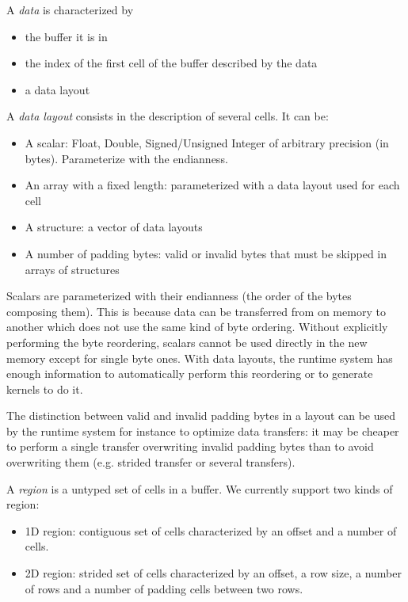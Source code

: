 \documentclass[twocolumn]{article}
\begin{document}
\begin{defin}
A \emph{data} is characterized by
\begin{itemize}
   \item the buffer it is in
   \item the index of the first cell of the buffer described by the data
   \item a data layout
\end{itemize}
\end{defin}

\begin{defin}
A \emph{data layout} consists in the description of several cells. It can be:
\begin{itemize}
   \item A scalar: Float, Double, Signed/Unsigned Integer of arbitrary precision
   (in bytes). Parameterize with the endianness.
   \item An array with a fixed length: parameterized with a data layout used for
   each cell
   \item A structure: a vector of data layouts
   \item A number of padding bytes: valid or invalid bytes that must be skipped
   in arrays of structures
\end{itemize}
\end{defin}

Scalars are parameterized with their endianness (the order of the bytes
composing them). This is because data can be transferred from on memory to
another which does not use the same kind of byte ordering. Without explicitly
performing the byte reordering, scalars cannot be used directly in the new
memory except for single byte ones. With data layouts, the runtime system has
enough information to automatically perform this reordering or to generate
kernels to do it.

The distinction between valid and invalid padding bytes in a layout can be used
by the runtime system for instance to optimize data transfers: it may be cheaper
to perform a single transfer overwriting invalid padding bytes than to avoid
overwriting them (e.g. strided transfer or several transfers).

\begin{defin}
A \emph{region} is a untyped set of cells in a buffer. We currently support two
kinds of region:
\begin{itemize}
   \item 1D region: contiguous set of cells characterized by an offset and a
   number of cells.
   \item 2D region: strided set of cells characterized by an offset, a row size,
   a number of rows and a number of padding cells between two rows.
\end{itemize}
\end{defin}
\end{document}
